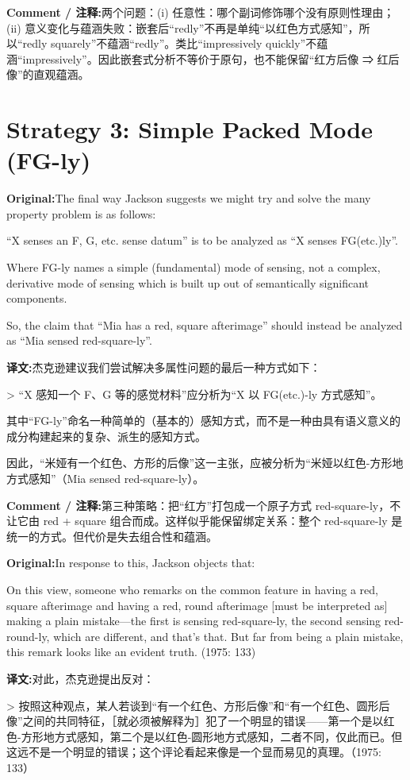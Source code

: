 \documentclass[11pt,a4paper]{article}
\newcommand{\eng}[1]{\begin{engbox}\noindent\textbf{Original:}\quad #1\end{engbox}}
\newcommand{\cn}[1]{\begin{cnbox}\noindent\textbf{译文:}\quad #1\end{cnbox}}
\newcommand{\cmt}[1]{\begin{commentbox}\noindent\textbf{Comment / 注释:}\quad #1\end{commentbox}}
\begin{document}
\cmt{两个问题：(i) 任意性：哪个副词修饰哪个没有原则性理由；(ii) 意义变化与蕴涵失败：嵌套后“redly”不再是单纯“以红色方式感知”，所以“redly squarely”不蕴涵“redly”。类比“impressively quickly”不蕴涵“impressively”。因此嵌套式分析不等价于原句，也不能保留“红方后像 ⇒ 红后像”的直观蕴涵。}

\section{Strategy 3: Simple Packed Mode (FG-ly)}

\eng{The final way Jackson suggests we might try and solve the many property problem is as follows:

“X senses an F, G, etc. sense datum” is to be analyzed as “X senses FG(etc.)ly”.

Where FG-ly names a simple (fundamental) mode of sensing, not a complex, derivative mode of sensing which is built up out of semantically significant components.

So, the claim that “Mia has a red, square afterimage” should instead be analyzed as “Mia sensed red-square-ly”.}

\cn{杰克逊建议我们尝试解决多属性问题的最后一种方式如下：

> “X 感知一个 F、G 等的感觉材料”应分析为“X 以 FG(etc.)-ly 方式感知”。

其中“FG-ly”命名一种简单的（基本的）感知方式，而不是一种由具有语义意义的成分构建起来的复杂、派生的感知方式。

因此，“米娅有一个红色、方形的后像”这一主张，应被分析为“米娅以红色-方形地方式感知”（Mia sensed red-square-ly）。}

\cmt{第三种策略：把“红方”打包成一个原子方式 red-square-ly，不让它由 red + square 组合而成。这样似乎能保留绑定关系：整个 red-square-ly 是统一的方式。但代价是失去组合性和蕴涵。}

\eng{In response to this, Jackson objects that:

On this view, someone who remarks on the common feature in having a red, square afterimage and having a red, round afterimage [must be interpreted as] making a plain mistake—the first is sensing red-square-ly, the second sensing red-round-ly, which are different, and that’s that. But far from being a plain mistake, this remark looks like an evident truth. (1975: 133)}

\cn{对此，杰克逊提出反对：

> 按照这种观点，某人若谈到“有一个红色、方形后像”和“有一个红色、圆形后像”之间的共同特征，［就必须被解释为］犯了一个明显的错误——第一个是以红色-方形地方式感知，第二个是以红色-圆形地方式感知，二者不同，仅此而已。但这远不是一个明显的错误；这个评论看起来像是一个显而易见的真理。（1975: 133）}
\end{document}
